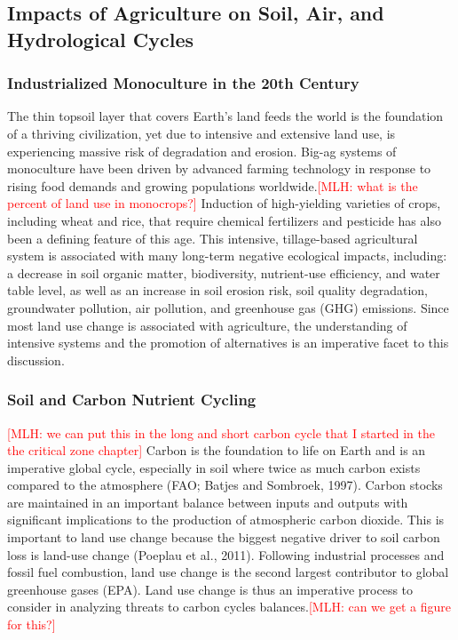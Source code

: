 \documentclass{book}\usepackage{knitr}
\newcommand{\red}[1]{\textcolor{red}{[MLH: #1]}}
\begin{document}
\subsection{Impacts of Agriculture on Soil, Air, and Hydrological Cycles}

\subsubsection{Industrialized Monoculture in the 20th Century}
The thin topsoil layer that covers Earth’s land feeds the world is the foundation of a thriving civilization, yet due to intensive and extensive land use, is experiencing massive risk of degradation and erosion. Big-ag systems of monoculture have been driven by advanced farming technology in response to rising food demands and growing populations worldwide.\red{what is the percent of land use in monocrops?} Induction of high-yielding varieties of crops, including wheat and rice, that require chemical fertilizers and pesticide has also been a defining feature of this age. This intensive, tillage-based agricultural system is associated with many long-term negative ecological impacts, including: a decrease in soil organic matter, biodiversity, nutrient-use efficiency, and water table level, as well as an increase in soil erosion risk, soil quality degradation, groundwater pollution, air pollution, and greenhouse gas (GHG) emissions. Since most land use change is associated with agriculture, the understanding of intensive systems and the promotion of alternatives is an imperative facet to this discussion.

\subsubsection{Soil and Carbon Nutrient Cycling}\red{we can put this in the long and short carbon cycle that I started in the the critical zone chapter}
Carbon is the foundation to life on Earth and is an imperative global cycle, especially in soil where twice as much carbon exists compared to the atmosphere (FAO; Batjes and Sombroek, 1997). Carbon stocks are maintained in an important balance between inputs and outputs with significant implications to the production of atmospheric carbon dioxide. This is important to land use change because the biggest negative driver to soil carbon loss is land-use change (Poeplau et al., 2011). Following industrial processes and fossil fuel combustion, land use change is the second largest contributor to global greenhouse gases (EPA). Land use change is thus an imperative process to consider in analyzing threats to carbon cycles balances.\red{can we get a figure for this?}
\end{document}
